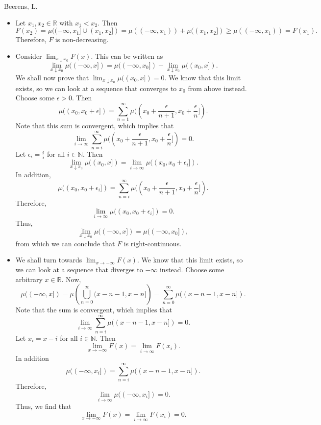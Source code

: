 \begin{solution}[3.11]{Beerens, L.}
    \begin{itemize}
        \item Let $x_1,x_2\in\mathbb{R}$ with $x_1<x_2$. Then
        $$
            F(x_2) = \mu((-\infty,x_1]\cup (x_1,x_2]) = \mu((-\infty, x_1)) + \mu((x_1,x_2])\geq\mu((-\infty, x_1)) = F(x_1).
        $$
        Therefore, $F$ is non-decreasing.
        
        \item Consider $\lim_{x\downarrow x_0}F(x)$. This can be written as 
        $$
            \lim_{x\downarrow x_0}\mu((-\infty,x]) = \mu((-\infty,x_0]) + \lim_{x\downarrow x_0}\mu((x_0,x]).
        $$
        We shall now prove that $\lim_{x\downarrow x_0}\mu((x_0,x]) = 0$. We know that this limit exists, so we can look at a sequence that converges to $x_0$ from above instead. Choose some $\epsilon>0$. Then 
        $$
            \mu((x_0,x_0+\epsilon]) = \sum_{n=1}^\infty \mu((x_0+\frac{\epsilon}{n+1},x_0+\frac{\epsilon}{n}]).
        $$
        Note that this sum is convergent, which implies that
        $$
            \lim_{i\rightarrow\infty}\sum_{n=i}^\infty \mu((x_0+\frac{\epsilon}{n+1},x_0+\frac{\epsilon}{n}]) = 0.
        $$
        Let $\epsilon_i=\frac{\epsilon}{i}$ for all $i\in\mathbb{N}$. Then 
        $$
            \lim_{x\downarrow x_0}\mu((x_0,x]) = \lim_{i\rightarrow\infty}\mu((x_0,x_0+\epsilon_i]).
        $$
        In addition,
        $$
            \mu((x_0,x_0+\epsilon_i]) = \sum_{n=i}^\infty \mu((x_0+\frac{\epsilon}{n+1},x_0+\frac{\epsilon}{n}]).
        $$
        Therefore, 
        $$
            \lim_{i\rightarrow\infty}\mu((x_0,x_0+\epsilon_i]) = 0.
        $$
        Thus,
        $$
            \lim_{x\downarrow x_0}\mu((-\infty,x]) = \mu((-\infty,x_0]),
        $$
        from which we can conclude that $F$ is right-continuous. 
        
        \item We shall turn towards $\lim_{x\rightarrow -\infty}F(x)$. We know that this limit exists, so we can look at a sequence that diverges to $-\infty$ instead. Choose some arbitrary $x\in\mathbb{R}$. Now,
        $$
            \mu((-\infty,x]) = \mu\left( \bigcup_{n=0}^\infty (x-n-1,x-n] \right) = \sum_{n=0}^\infty\mu((x-n-1,x-n]).
        $$
        Note that the sum is convergent, which implies that
        $$
            \lim_{i\rightarrow\infty}\sum_{n=i}^\infty\mu((x-n-1,x-n]) = 0.
        $$
        Let $x_i = x-i$ for all $i\in\mathbb{N}$. Then 
        $$
            \lim_{x\rightarrow -\infty}F(x) = \lim_{i\rightarrow \infty}F(x_i).
        $$
        In addition
        $$
            \mu((-\infty, x_i]) = \sum_{n=i}^\infty\mu((x-n-1,x-n]).
        $$
        Therefore, 
        $$
            \lim_{i \rightarrow \infty}\mu((-\infty, x_i]) = 0.
        $$
        Thus, we find that 
        $$
            \lim_{x\rightarrow -\infty}F(x)= \lim_{i\rightarrow \infty}F(x_i)=0.
        $$
        

\end{itemize}
\end{solution}
